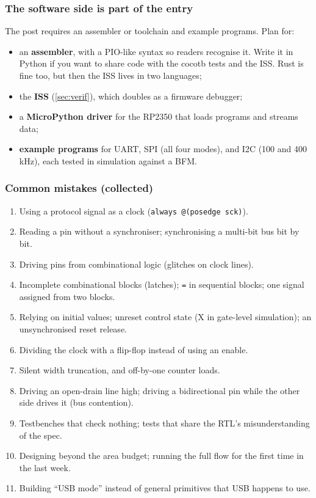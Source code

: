 \subsubsection{The software side is part of the entry}
The post requires an assembler or toolchain and example programs. Plan for:
\begin{itemize}
  \item an \textbf{assembler}, with a PIO-like syntax so readers recognise
    it. Write it in Python if you want to share code with the cocotb tests
    and the ISS. Rust is fine too, but then the ISS lives in two languages;
  \item the \textbf{ISS} (\cref{sec:verif}), which doubles as a firmware
    debugger;
  \item a \textbf{MicroPython driver} for the RP2350 that loads programs and
    streams data;
  \item \textbf{example programs} for UART, SPI (all four modes), and I2C
    (100 and 400\,kHz), each tested in simulation against a BFM.
\end{itemize}

\subsubsection{Common mistakes (collected)}
\begin{enumerate}[label=\arabic*.]
  \item Using a protocol signal as a clock (\texttt{always @(posedge sck)}).
  \item Reading a pin without a synchroniser; synchronising a multi-bit bus
    bit by bit.
  \item Driving pins from combinational logic (glitches on clock lines).
  \item Incomplete combinational blocks (latches); \texttt{=} in sequential
    blocks; one signal assigned from two blocks.
  \item Relying on initial values; unreset control state (X in gate-level
    simulation); an unsynchronised reset release.
  \item Dividing the clock with a flip-flop instead of using an enable.
  \item Silent width truncation, and off-by-one counter loads.
  \item Driving an open-drain line high; driving a bidirectional pin while
    the other side drives it (bus contention).
  \item Testbenches that check nothing; tests that share the RTL's
    misunderstanding of the spec.
  \item Designing beyond the area budget; running the full flow for the
    first time in the last week.
  \item Building ``USB mode'' instead of general primitives that USB happens
    to use.
\end{enumerate}

